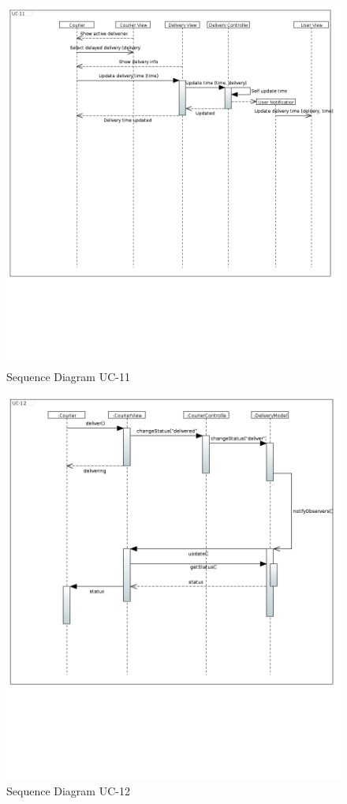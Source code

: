 \begin{figure}[h!]
\begin{center}
\includegraphics[scale=0.35]{FIGS/UC-112.PNG}
    \caption{Sequence Diagram UC-11}
    \label{fig:seq_diag11}
\end{center}
\end{figure}

\begin{figure}[h!]
\begin{center}
\includegraphics[scale=0.35]{FIGS/UC-121.PNG}
    \caption{Sequence Diagram UC-12}
    \label{fig:seq_diag12}
\end{center}
\end{figure}